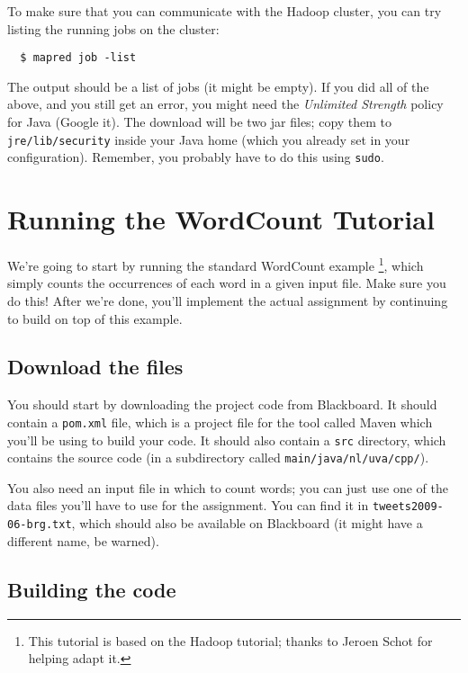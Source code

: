 \documentclass[a4paper,11pt]{article}
\begin{document}
  To make sure that you can communicate with the Hadoop cluster, you can try listing the running jobs on the cluster:

  \begin{lstlisting}
  $ mapred job -list
  \end{lstlisting}

  The output should be a list of jobs (it might be empty). If you did all of the above, and you
  still get an error, you might need the \emph{Unlimited Strength} policy for Java (Google it). The download will
  be two jar files; copy them to \texttt{jre/lib/security} inside your Java home (which you already set in your
  configuration). Remember, you probably have to do this using \texttt{sudo}.

  \pagebreak
  \section{Running the WordCount Tutorial}


  We're going to start by running the standard WordCount example \footnote{This tutorial is based on the Hadoop tutorial; thanks to Jeroen Schot for helping adapt it.},
  which simply counts the occurrences of each word in a given input file.
  Make sure you do this! After we're done, you'll implement the actual assignment by continuing to build on top of this example.

  \subsection{Download the files}

  You should start by downloading the project code from Blackboard. It should contain a \texttt{pom.xml} file, which is a project file for the tool
  called Maven which you'll be using to build your code. It should also contain a \texttt{src} directory, which contains the source code (in a
  subdirectory called \texttt{main/java/nl/uva/cpp/}).

  You also need an input file in which to count words; you can just use one of the data files you'll have to use for the assignment.
  You can find it in \texttt{tweets2009-06-brg.txt}, which should also be available on Blackboard (it might have a different name,
  be warned).

  \subsection{Building the code}
\end{document}
